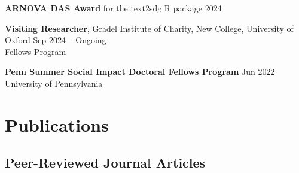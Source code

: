 \documentclass[11pt,letterpaper]{article}
\begin{document}
\textbf{ARNOVA DAS Award} for the text2sdg R package \hfill 2024

\textbf{Visiting Researcher}, Gradel Institute of Charity, New College, University of Oxford \hfill Sep 2024 -- Ongoing \\
Fellows Program

\textbf{Penn Summer Social Impact Doctoral Fellows Program} \hfill Jun 2022 \\
University of Pennsylvania

\section*{Publications}

\subsection*{Peer-Reviewed Journal Articles}
\end{document}
